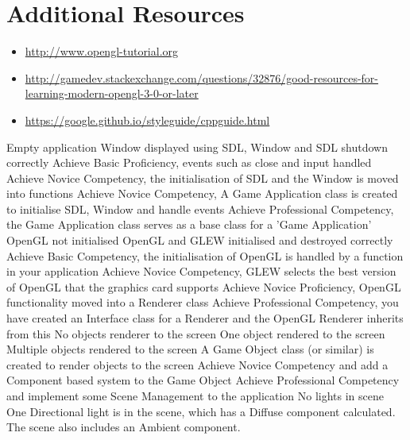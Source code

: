 \documentclass{../../fal_assignment}
\begin{document}
\section*{Additional Resources}

\begin{itemize}
    \item \url{http://www.opengl-tutorial.org}
    \item \url{http://gamedev.stackexchange.com/questions/32876/good-resources-for-learning-modern-opengl-3-0-or-later}
    \item \url{https://google.github.io/styleguide/cppguide.html}
\end{itemize}

\rubricyeartwo
\begin{markingrubric}
		\grade\fail Empty application
		\grade Window displayed using SDL, Window and SDL shutdown correctly
		\grade Achieve Basic Proficiency, events such as close and input handled
		\grade Achieve Novice Competency, the initialisation of SDL and the Window is moved into functions
		\grade Achieve Novice Competency, A Game Application class is created to initialise SDL, Window and handle events
		\grade Achieve Professional Competency, the Game Application class serves as a base class for a 'Game Application' 
		\grade\fail OpenGL not initialised 
		\grade OpenGL and GLEW initialised and destroyed correctly
		\grade Achieve Basic Competency, the initialisation of OpenGL is handled by a function in your application
		\grade Achieve Novice Competency, GLEW selects the best version of OpenGL that the graphics card supports
		\grade Achieve Novice Proficiency, OpenGL functionality moved into a Renderer class
		\grade Achieve Professional Competency, you have created an Interface class for a Renderer and the OpenGL Renderer inherits from this
		\grade\fail No objects renderer to the screen
		\grade One object rendered to the screen
		\grade Multiple objects rendered to the screen
		\grade A Game Object class (or similar) is created to render objects to the screen
		\grade Achieve Novice Competency and add a Component based system to the Game Object 
		\grade Achieve Professional Competency and implement some Scene Management to the application
		\grade\fail No lights in scene
		\grade One Directional light is in the scene, which has a Diffuse component calculated. The scene also includes an Ambient component.

\end{markingrubric}
\end{document}
